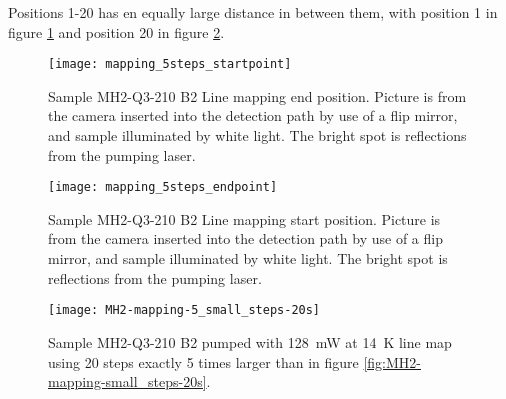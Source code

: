 Positions 1-20 has en equally large distance in between them, with position 1 in figure \ref{fig:mapping_5steps_startpoint} and position 20 in figure \ref{fig:mapping_5steps_endpoint}.

\begin{figure}[H]
\centering
\texttt{[image: mapping\_5steps\_startpoint]}
\caption[MH2-Q3-210 line mapping start position]{Sample MH2-Q3-210 B2 Line mapping end position. Picture is from the camera inserted into the detection path by use of a flip mirror, and sample illuminated by white light. The bright spot is reflections from the pumping laser.}
\label{fig:mapping_5steps_startpoint}%
\end{figure}


\begin{figure}[H]
\centering
\texttt{[image: mapping\_5steps\_endpoint]}
\caption[MH2-Q3-210 line mapping start position]{Sample MH2-Q3-210 B2 Line mapping start position. Picture is from the camera inserted into the detection path by use of a flip mirror, and sample illuminated by white light. The bright spot is reflections from the pumping laser.}
\label{fig:mapping_5steps_endpoint}%
\end{figure}

\begin{figure}[H]
\centering
\texttt{[image: MH2-mapping-5\_small\_steps-20s]}
\caption[MH2-Q3-210 line mapping]{Sample MH2-Q3-210 B2 pumped with 128~mW at 14~K line map using 20 steps exactly 5 times larger than in figure \ref{fig:MH2-mapping-small_steps-20s}.}
\label{fig:MH2-mapping-5_small_steps-20s}%
\end{figure}



